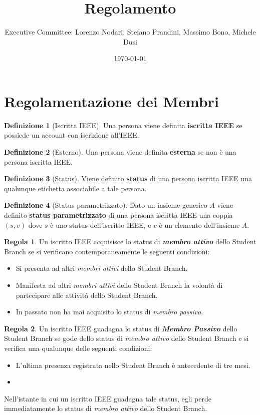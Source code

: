 \documentclass[pdf]{article}
\title{Regolamento}
\author{Executive Committee: Lorenzo Nodari, Stefano Prandini, Massimo Bono, Michele Dusi}
\date{\today}
\theoremstyle{definition}
\newtheorem{defn}{Definizione}[section]
\newtheorem{regl}{Regola}[section]
\renewcommand{\i}[1]{\textit{#1}}
\renewcommand{\b}[1]{\textbf{#1}}
\begin{document}
\maketitle

\newpage

\section{Regolamentazione dei Membri}

\begin{defn}[Iscritta IEEE]
	Una persona viene definita \b{iscritta IEEE} se possiede un account con iscrizione all'IEEE.
\end{defn}

\begin{defn}[Esterno]
	Una persona viene definita \b{esterna} se non è una persona iscritta IEEE.
\end{defn}

\begin{defn}[Status]
	Viene definito \b{status} di una persona iscritta IEEE una qualunque etichetta associabile a tale persona.
\end{defn}

\begin{defn}[Status parametrizzato]
Dato un insieme generico $A$ viene definito \b{status parametrizzato} di una persona iscritta IEEE una coppia $(s,v)$ dove $s$ è uno status dell'iscritto IEEE, e $v$ è un elemento dell'insieme $A$.
\end{defn}

\begin{regl}
	Un iscritto IEEE acquisisce lo status di \b{\i{membro attivo}} dello Student Branch se si verificano contemporaneamente le seguenti condizioni:
	\begin{itemize}
		\item Si presenta ad altri \i{membri attivi} dello Student Branch.
		\item Manifesta ad altri \i{membri attivi} dello Student Branch la volontà di partecipare alle attività dello Student Branch.
		\item In passato non ha mai acquisito lo status di \i{membro passivo}.
	\end{itemize}
\end{regl}

\begin{regl}
	Un iscritto IEEE guadagna lo status di \b{\i{Membro Passivo}} dello Student Branch se gode dello status di \i{membro attivo} dello Student Branch e si verifica una qualunque delle seguenti condizioni:
	\begin{itemize}
		\item L'ultima presenza registrata nello Student Branch è antecedente di tre mesi.
		\item 
	\end{itemize}
	Nell'istante in cui un iscritto IEEE guadagna tale status, egli perde immediatamente lo status di \i{membro attivo} dello Student Branch.
\end{regl}
\end{document}
